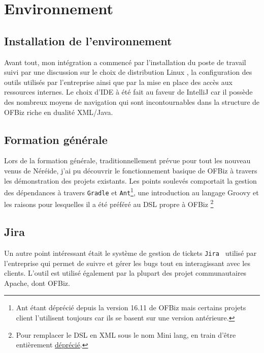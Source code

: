 \newpage









\section{Environnement}

\subsection{Installation de l'environnement}
Avant tout, mon intégration a commencé par l'installation du poste de travail suivi par une discussion sur le choix de distribution Linux , la configuration des outils utilisés par l'entreprise ainsi que par la mise en place des accès aux ressources internes. Le choix d'IDE à été fait au faveur de IntelliJ car il possède des nombreux moyens de navigation qui sont incontournables dans la structure de OFBiz riche en dualité XML/Java. 




\subsection{Formation générale}


Lors de la formation générale, traditionnellement prévue pour tout les nouveau venus de Néréide, j'ai pu découvrir le fonctionnement basique de OFBiz à travers les démonstration des projets existants. Les points soulevés comportait la gestion des dépendances à travers \verb|Gradle| et \verb|Ant|\footnote{Ant étant déprécié depuis la version 16.11 de OFBiz mais certains projets client l'utilisent toujours car ils se basent sur une version antérieure.  }, une introduction au langage Groovy et les raisons pour lesquelles il a été préféré au DSL propre à OFBiz \footnote{Pour remplacer le DSL en XML  sous le nom Mini lang, en train d'être entièrement \href{https://cwiki.apache.org/confluence/display/OFBIZ/Mini+Lang+Deprecation}{déprécié}. }


\subsection{Jira}
Un autre point intéressant était le système de gestion de tickets \verb|Jira | utilisé par l'entreprise qui permet de suivre et gérer les bugs tout en interagissant avec les clients. L'outil est utilisé également par la plupart des projet communautaires Apache, dont OFBiz.

